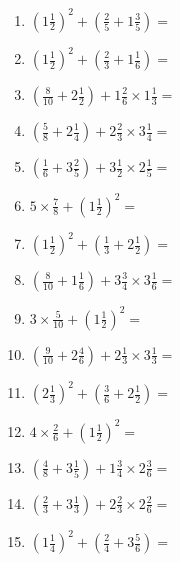 \documentclass[12pt]{article}
\begin{document}
\begin{enumerate}
\item \large $ (1 \frac{1}{2})^2 + (\frac{2}{5} + 1 \frac{3}{5}) = $ \vspace{1.8cm}
\item \large $ (1 \frac{1}{2})^2 + (\frac{2}{3} + 1 \frac{1}{6}) = $ \vspace{1.8cm}
\item \large $ (\frac{8}{10} + 2 \frac{1}{2}) + 1 \frac{2}{6} \times 1 \frac{1}{3} = $ \vspace{1.8cm}
\item \large $ (\frac{5}{8} + 2 \frac{1}{4}) + 2 \frac{2}{3} \times 3 \frac{1}{4} = $ \vspace{1.8cm}
\item \large $ (\frac{1}{6} + 3 \frac{2}{5}) + 3 \frac{1}{2} \times 2 \frac{1}{5} = $ \vspace{1.8cm}
\item \large $ 5 \times \frac{7}{8} + (1 \frac{1}{2})^2 = $ \vspace{1.8cm}
\item \large $ (1 \frac{1}{2})^2 + (\frac{1}{3} + 2 \frac{1}{2}) = $ \vspace{1.8cm}
\item \large $ (\frac{8}{10} + 1 \frac{1}{6}) + 3 \frac{3}{4} \times 3 \frac{1}{6} = $ \vspace{1.8cm}
\item \large $ 3 \times \frac{5}{10} + (1 \frac{1}{2})^2 = $ \vspace{1.8cm}
\item \large $ (\frac{9}{10} + 2 \frac{4}{6}) + 2 \frac{1}{3} \times 3 \frac{1}{3} = $ \vspace{1.8cm}
\newpage
\item \large $ (2 \frac{1}{3})^2 + (\frac{3}{6} + 2 \frac{1}{2}) = $ \vspace{1.8cm}
\item \large $ 4 \times \frac{2}{6} + (1 \frac{1}{2})^2 = $ \vspace{1.8cm}
\item \large $ (\frac{4}{8} + 3 \frac{1}{5}) + 1 \frac{3}{4} \times 2 \frac{3}{6} = $ \vspace{1.8cm}
\item \large $ (\frac{2}{3} + 3 \frac{1}{3}) + 2 \frac{2}{3} \times 2 \frac{2}{6} = $ \vspace{1.8cm}
\item \large $ (1 \frac{1}{4})^2 + (\frac{2}{4} + 3 \frac{5}{6}) = $ \vspace{1.8cm}

\end{enumerate}
\end{document}
